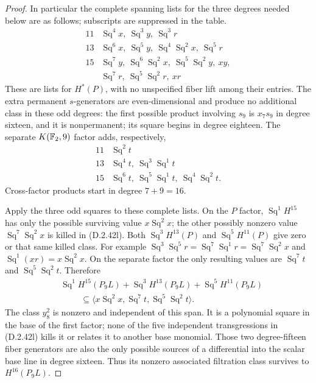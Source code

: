 \begin{proof}
In particular the complete spanning lists for the three
degrees needed below are as follows; subscripts are suppressed
in the table.
\[
\begin{array}{c|l}
11&\operatorname{Sq}^4x,\ 
    \operatorname{Sq}^3y,\ \operatorname{Sq}^3r\\
13&\operatorname{Sq}^6x,\ \operatorname{Sq}^5y,\
    \operatorname{Sq}^4\operatorname{Sq}^2x,\
    \operatorname{Sq}^5r\\
15&\operatorname{Sq}^7y,\
    \operatorname{Sq}^6\operatorname{Sq}^2x,\
    \operatorname{Sq}^5\operatorname{Sq}^2y,\ xy,\\
  &\operatorname{Sq}^7r,\
    \operatorname{Sq}^5\operatorname{Sq}^2r,\ xr
\end{array}
\tag{D.2.42m}
\]
These are lists for $H^*(P)$, with no unspecified fiber lift
among their entries.  The extra permanent $s$-generators are
even-dimensional and produce no additional class in these
odd degrees: the first possible product involving $s_9$ is
$x_7s_9$ in degree sixteen, and it is nonpermanent; its
square begins in degree eighteen.
The separate $K(\mathbb F_2,9)$ factor adds, respectively,
\[
\begin{array}{c|l}
11&\operatorname{Sq}^2t\\
13&\operatorname{Sq}^4t,\ 
            \operatorname{Sq}^3\operatorname{Sq}^1t\\
15&\operatorname{Sq}^6t,\
            \operatorname{Sq}^5\operatorname{Sq}^1t,\
            \operatorname{Sq}^4\operatorname{Sq}^2t.
\end{array}
\tag{D.2.42n}
\]
Cross-factor products start in degree $7+9=16$.

Apply the three odd squares to these complete lists.
On the $P$ factor, $\operatorname{Sq}^1H^{15}$ has only
the possible surviving value $x\operatorname{Sq}^2x$;
the other possibly nonzero value
$\operatorname{Sq}^7\operatorname{Sq}^2x$ is killed in
\textup{(D.2.42l)}.
Both $\operatorname{Sq}^3H^{13}(P)$ and
$\operatorname{Sq}^5H^{11}(P)$ give zero or that same killed
class.  For example
$\operatorname{Sq}^3\operatorname{Sq}^5r
=\operatorname{Sq}^7\operatorname{Sq}^1r
=\operatorname{Sq}^7\operatorname{Sq}^2x$ and
$\operatorname{Sq}^1(xr)=x\operatorname{Sq}^2x$.
On the separate factor the only resulting values are
$\operatorname{Sq}^7t$ and
$\operatorname{Sq}^5\operatorname{Sq}^2t$.
Therefore
\[
\begin{split}
 &\operatorname{Sq}^1H^{15}(P_9L)
  +\operatorname{Sq}^3H^{13}(P_9L)
  +\operatorname{Sq}^5H^{11}(P_9L)\\
 &\hspace{1cm}\subseteq
 \langle x\operatorname{Sq}^2x,
         \operatorname{Sq}^7t,
         \operatorname{Sq}^5\operatorname{Sq}^2t\rangle.
\end{split}
\tag{D.2.42o}
\]
The class $y_8^2$ is nonzero and independent of this span.
It is a polynomial square in the base of the first factor;
none of the five independent transgressions in
\textup{(D.2.42l)} kills it or relates it to another base
monomial.  Those two degree-fifteen fiber generators are also
the only possible sources of a differential into the scalar
base line in degree sixteen.  Thus its nonzero associated
filtration class survives to $H^{16}(P_9L)$.


\end{proof}
